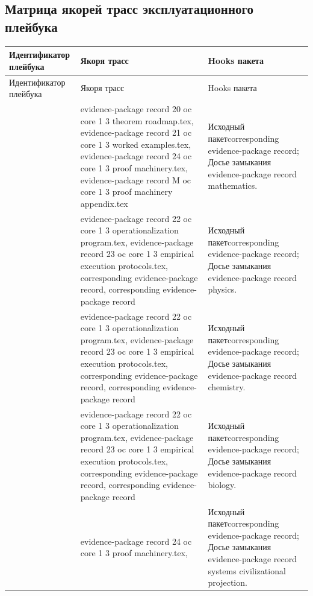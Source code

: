 \subsection{Матрица якорей трасс эксплуатационного плейбука}
\begin{longtable}{@{}L{0.16\textwidth}L{0.38\textwidth}L{0.34\textwidth}@{}}
\toprule
Идентификатор плейбука & Якоря трасс & Hooks пакета \\
\midrule
\endfirsthead
\toprule
Идентификатор плейбука & Якоря трасс & Hooks пакета \\
\midrule
\endhead
{} & evidence-package record 20 oc core 1 3 theorem roadmap.tex, \allowbreak evidence-package record 21 oc core 1 3 worked examples.tex, \allowbreak evidence-package record 24 oc core 1 3 proof machinery.tex, \allowbreak evidence-package record M oc core 1 3 proof machinery appendix.tex & Исходный пакетcorresponding evidence-package record; Досье замыкания evidence-package record mathematics. \\
 & evidence-package record 22 oc core 1 3 operationalization program.tex, \allowbreak evidence-package record 23 oc core 1 3 empirical execution protocols.tex, corresponding evidence-package record, corresponding evidence-package record & Исходный пакетcorresponding evidence-package record; Досье замыкания evidence-package record physics. \\
 & evidence-package record 22 oc core 1 3 operationalization program.tex, \allowbreak evidence-package record 23 oc core 1 3 empirical execution protocols.tex, corresponding evidence-package record, corresponding evidence-package record & Исходный пакетcorresponding evidence-package record; Досье замыкания evidence-package record chemistry. \\
 & evidence-package record 22 oc core 1 3 operationalization program.tex, \allowbreak evidence-package record 23 oc core 1 3 empirical execution protocols.tex, corresponding evidence-package record, corresponding evidence-package record & Исходный пакетcorresponding evidence-package record; Досье замыкания evidence-package record biology. \\
 & evidence-package record 24 oc core 1 3 proof machinery.tex, \allowbreak {} & Исходный пакетcorresponding evidence-package record; Досье замыкания evidence-package record systems civilizational projection. \\
\bottomrule
\end{longtable}

